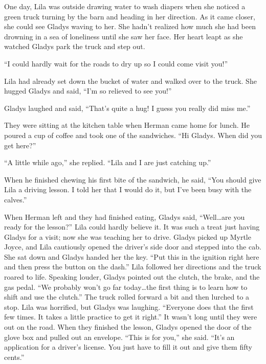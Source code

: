 \documentclass[
  letterpaper,
]{book}
\begin{document}
One day, Lila was outside drawing water to wash diapers when she noticed
a green truck turning by the barn and heading in her direction. As it
came closer, she could see Gladys waving to her. She hadn't realized how
much she had been drowning in a sea of loneliness until she saw her
face. Her heart leapt as she watched Gladys park the truck and step out.

``I could hardly wait for the roads to dry up so I could come visit
you!''

Lila had already set down the bucket of water and walked over to the
truck. She hugged Gladys and said, ``I'm so relieved to see you!''

Gladys laughed and said, ``That's quite a hug! I guess you really did
miss me.''

They were sitting at the kitchen table when Herman came home for lunch.
He poured a cup of coffee and took one of the sandwiches. ``Hi Gladys.
When did you get here?''

``A little while ago,'' she replied. ``Lila and I are just catching
up.''

When he finished chewing his first bite of the sandwich, he said, ``You
should give Lila a driving lesson. I told her that I would do it, but
I've been busy with the calves.''

When Herman left and they had finished eating, Gladys said,
``Well\ldots are you ready for the lesson?'' Lila could hardly believe
it. It was such a treat just having Gladys for a visit; now she was
teaching her to drive. Gladys picked up Myrtle Joyce, and Lila
cautiously opened the driver's side door and stepped into the cab. She
sat down and Gladys handed her the key. ``Put this in the ignition right
here and then press the button on the dash.'' Lila followed her
directions and the truck roared to life. Speaking louder, Gladys pointed
out the clutch, the brake, and the gas pedal. ``We probably won't go far
today\ldots the first thing is to learn how to shift and use the
clutch.'' The truck rolled forward a bit and then lurched to a stop.
Lila was horrified, but Gladys was laughing. ``Everyone does that the
first few times. It takes a little practice to get it right.'' It wasn't
long until they were out on the road. When they finished the lesson,
Gladys opened the door of the glove box and pulled out an envelope.
``This is for you,'' she said. ``It's an application for a driver's
license. You just have to fill it out and give them fifty cents.''
\end{document}
